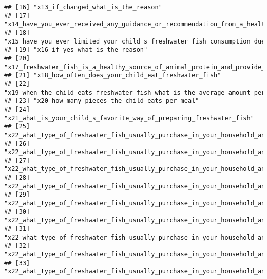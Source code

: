 \documentclass[
]{article}
\begin{document}
\begin{verbatim}
## [16] "x13_if_changed_what_is_the_reason"                                                                                                           
## [17] "x14_have_you_ever_received_any_guidance_or_recommendation_from_a_healthcare_professional_regarding_freshwater_fish_consumption_of_your_child"
## [18] "x15_have_you_ever_limited_your_child_s_freshwater_fish_consumption_due_to_any_reason"                                                        
## [19] "x16_if_yes_what_is_the_reason"                                                                                                               
## [20] "x17_freshwater_fish_is_a_healthy_source_of_animal_protein_and_provide_other_important_nutrients_for_children"                                
## [21] "x18_how_often_does_your_child_eat_freshwater_fish"                                                                                           
## [22] "x19_when_the_child_eats_freshwater_fish_what_is_the_average_amount_per_day"                                                                  
## [23] "x20_how_many_pieces_the_child_eats_per_meal"                                                                                                 
## [24] "x21_what_is_your_child_s_favorite_way_of_preparing_freshwater_fish"                                                                          
## [25] "x22_what_type_of_freshwater_fish_usually_purchase_in_your_household_and_how_much_per_month_tilapia"                                          
## [26] "x22_what_type_of_freshwater_fish_usually_purchase_in_your_household_and_how_much_per_month_korali"                                           
## [27] "x22_what_type_of_freshwater_fish_usually_purchase_in_your_household_and_how_much_per_month_hunga"                                            
## [28] "x22_what_type_of_freshwater_fish_usually_purchase_in_your_household_and_how_much_per_month_loolla"                                           
## [29] "x22_what_type_of_freshwater_fish_usually_purchase_in_your_household_and_how_much_per_month_pethiya"                                          
## [30] "x22_what_type_of_freshwater_fish_usually_purchase_in_your_household_and_how_much_per_month_aandha"                                           
## [31] "x22_what_type_of_freshwater_fish_usually_purchase_in_your_household_and_how_much_per_month_kawayya"                                          
## [32] "x22_what_type_of_freshwater_fish_usually_purchase_in_your_household_and_how_much_per_month_ankutta"                                          
## [33] "x22_what_type_of_freshwater_fish_usually_purchase_in_your_household_and_how_much_per_month_magura"                                           

\end{verbatim}
\end{document}
